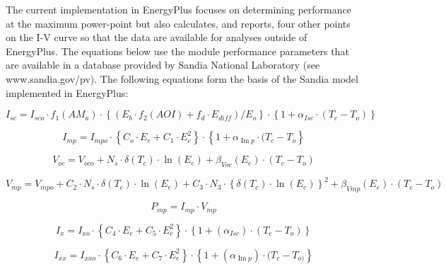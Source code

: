 The current implementation in EnergyPlus focuses on determining performance at the maximum power-point but also calculates, and reports, four other points on the I-V curve so that the data are available for analyses outside of EnergyPlus. The equations below use the module performance parameters that are available in a database provided by Sandia National Laboratory (see www.sandia.gov/pv). The following equations form the basis of the Sandia model implemented in EnergyPlus:

\begin{equation}
{I_{sc}} = {I_{sco}} \cdot {f_1}\left( {A{M_a}} \right) \cdot \left\{ {\left( {{E_b} \cdot {f_2}\left( {AOI} \right) + {f_d} \cdot {E_{diff}}} \right)/{E_o}} \right\} \cdot \left\{ {1 + {\alpha_{Isc}} \cdot \left( {{T_c} - {T_o}} \right)} \right\}
\end{equation}

\begin{equation}
{I_{mp}} = {I_{mpo}} \cdot \left\{ {{C_o} \cdot {E_e} + {C_1} \cdot E_e^2} \right\} \cdot \left\{ {1 + {\alpha_{\operatorname{Im} p}} \cdot ({T_c} - {T_o}} \right\}
\end{equation}

\begin{equation}
{V_{oc}} = {V_{oco}} + {N_s} \cdot \delta ({T_c}) \cdot \ln ({E_e}) + {\beta_{Voc}}({E_e}) \cdot \left( {{T_c} - {T_o}} \right)
\end{equation}

\begin{equation}
{V_{mp}} = {V_{mpo}} + {C_2} \cdot {N_s} \cdot \delta \left( {T_c^{}} \right) \cdot \ln \left( {{E_e}} \right) + {C_3} \cdot {N_3} \cdot {\left\{ {\delta \left( {T_c^{}} \right) \cdot \ln \left( {{E_e}} \right)} \right\}^2} + {\beta_{Vmp}}({E_e}) \cdot ({T_c} - {T_o})
\end{equation}

\begin{equation}
{P_{mp}} = {I_{mp}} \cdot {V_{mp}}
\end{equation}

\begin{equation}
{I_x} = {I_{xo}} \cdot \left\{ {{C_4} \cdot {E_e} + {C_5} \cdot E_e^2} \right\} \cdot \left\{ {1 + ({\alpha_{Isc}}) \cdot ({T_c} - {T_o})} \right\}
\end{equation}

\begin{equation}
{I_{xx}} = {I_{xxo}} \cdot \left\{ {{C_6} \cdot {E_e} + {C_7} \cdot E_e^2} \right\} \cdot \left\{ {1 + ({\alpha_{\operatorname{Im} p}}) \cdot ({T_c} - {T_{o)}}} \right\}
\end{equation}

